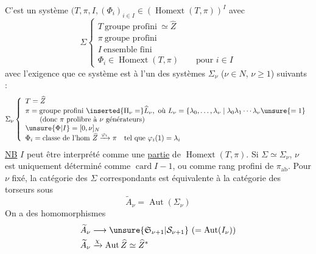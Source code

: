 C'est un système \inserted{$\Sigma=$}
$(T,\pi,I,(\Phi_i)_{i\in I}\in(\operatorname{Homext}(T,\pi))^I$
avec
\[\Sigma\left\{\begin{array}{l}
T\ \text{groupe profini}\ \simeq\widehat Z\\
\pi\ \text{groupe profini}\\
I\ \text{ensemble fini}\\
\Phi_i\in\operatorname{Homext}(T,\pi)\qquad\text{pour }i\in I
\end{array}\right.\]
avec l'exigence que ce système est
à l'un des systèmes $\Sigma_\nu$ ($\nu\in N$, $\nu\ge1$)
suivants :
\[\Sigma_\nu\left\{\begin{array}{l}
T=\widehat Z\\
\pi=\text{groupe profini}\ \inserted{\Pi_\nu=}\widehat L_\nu,\ \text{où }L_\nu=\left\{\lambda_0,\ldots,\lambda_\nu\mid\lambda_0\lambda_1\cdots\lambda_\nu\unsure{=1}\right.\\
\qquad(\text{donc }\pi\text{ prolibre à }\nu\text{ générateurs})\\
\unsure{\Phi|I}=[0,\nu]_N\\
\Phi_i=\text{classe de l'hom }\widehat Z\xrightarrow{\varphi_i}\pi\quad\text{tel que }\varphi_i(1)=\lambda_i
\end{array}\right.\]
\uline{NB} $I$ peut être interprété comme une \uline{partie} de $\operatorname{Homext}(T,\pi)$.
Si $\Sigma\simeq\Sigma_\nu$, $\nu$ est uniquement déterminé
comme $\operatorname{card}I-1$, ou 
 comme rang profini de $\pi_{\mathrm{ab}}$.
Pour $\nu$ fixé, la catégorie des $\Sigma$ correspondants
est équivalente à la catégorie des torseurs
sous
\[\widetilde A_\nu=\operatorname{Aut}(\Sigma_\nu)\]
On a des homomorphismes
\[\begin{aligned}
\widetilde A_\nu&\longrightarrow\unsure{\mathfrak S_{\nu+1}|\mathcal S_{\nu+1}}\ (=\operatorname{Aut}(I_\nu))\\
\widetilde A_\nu&\xrightarrow{\chi}\operatorname{Aut}\widehat Z\simeq\widehat Z^*
\end{aligned}\]

